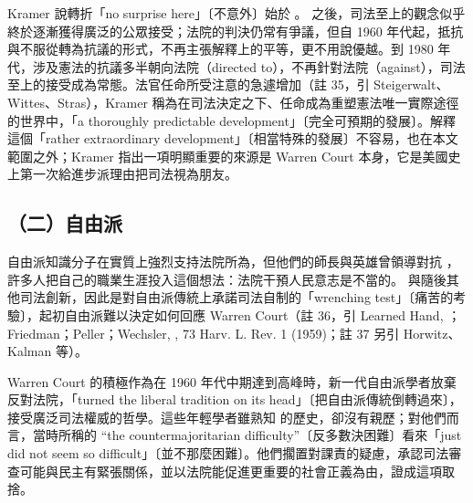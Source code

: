 Kramer 說轉折「no surprise here」〔不意外〕始於 。 之後，司法至上的觀念似乎終於逐漸獲得廣泛的公眾接受；法院的判決仍常有爭議，但自 1960 年代起，抵抗與不服從轉為抗議的形式，不再主張解釋上的平等，更不用說優越。到 1980 年代，涉及憲法的抗議多半朝向法院（directed to），不再針對法院（against），司法至上的接受成為常態。法官任命所受注意的急遽增加（註 35，引 Steigerwalt、Wittes、Stras），Kramer 稱為在司法決定之下、任命成為重塑憲法唯一實際途徑的世界中，「a thoroughly predictable development」〔完全可預期的發展〕。解釋這個「rather extraordinary development」〔相當特殊的發展〕不容易，也在本文範圍之外；Kramer 指出一項明顯重要的來源是 Warren Court 本身，它是美國史上第一次給進步派理由把司法視為朋友。

\subsection{（二）自由派}

自由派知識分子在實質上強烈支持法院所為，但他們的師長與英雄曾領導對抗 ，許多人把自己的職業生涯投入這個想法：法院干預人民意志是不當的。 與隨後其他司法創新，因此是對自由派傳統上承諾司法自制的「wrenching test」〔痛苦的考驗〕，起初自由派難以決定如何回應 Warren Court（註 36，引 Learned Hand, ；Friedman；Peller；Wechsler, , 73 Harv. L. Rev. 1 (1959)；註 37 另引 Horwitz、Kalman 等）。

Warren Court 的積極作為在 1960 年代中期達到高峰時，新一代自由派學者放棄反對法院，「turned the liberal tradition on its head」〔把自由派傳統倒轉過來〕，接受廣泛司法權威的哲學。這些年輕學者雖熟知  的歷史，卻沒有親歷；對他們而言，當時所稱的 ``the countermajoritarian difficulty''〔反多數決困難〕看來「just did not seem so difficult」〔並不那麼困難〕。他們擱置對課責的疑慮，承認司法審查可能與民主有緊張關係，並以法院能促進更重要的社會正義為由，證成這項取捨。

